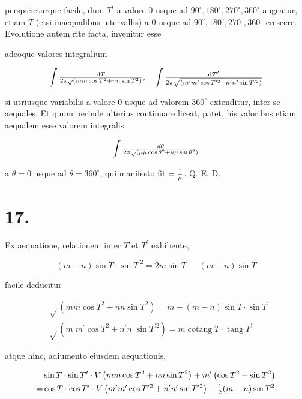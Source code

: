 \documentclass[twoside,12pt, showframe]{memoir}
\let\oldfrac\frac
\def\frac#1#2{\mathchoice{\tfrac{#1}{#2}}{\oldfrac{#1}{#2}}{\genfrac{}{}{}{2}{#1}{#2\mathstrut}}{\genfrac{}{}{}{3}{#1}{#2\mathstrut}}}
\begin{document}
perspicieturque facile, dum \(T^{\prime}\) a valore 0 usque ad \(90^{\circ}, 180^{\circ}, 270^{\circ}, 360^{\circ}\) augeatur, etiam \(T\) (etsi inaequalibus intervallis) a 0 usque ad \(90^{\circ}, 180^{\circ}, 270^{\circ}, 360^{\circ}\) crescere. Evolutione autem rite facta, invenitur esse

adeoque valores integralium

\[
\int \frac{\mathrm{d} T}{2 \pi \sqrt{ }\left(m m \cos T^{2}+n n \sin T^{2}\right)}, \quad \int \frac{\mathrm{d} \boldsymbol{T}^{\prime}}{2 \pi \sqrt{\left(m^{\prime} m^{\prime} \cos T^{\prime 2}+n^{\prime} n^{\prime} \sin T^{\prime 2}\right)}}
\]

si utriusque variabilis a valore 0 usque ad valorem \(360^{\circ}\) extenditur, inter se aequales. Et quum perinde ulterius continuare liceat, patet, his valoribus etiam aequalem esse valorem integralis

\[
\int \frac{d \theta}{2 \pi \sqrt{ }\left(\mu \mu \cos \theta^{2}+\mu \mu \sin \theta^{2}\right)}
\]

a \(\theta=0\) usque ad \(\theta=360^{\circ}\), qui manifesto fit \(=\frac{1}{\mu}\). Q. E. D.

\section*{17.}
Ex aequatione, relationem inter \(T\) et \(T^{\prime}\) exhibente,

\[
(m-n) \sin T \cdot \sin T^{\prime 2}=2 m \sin T^{\prime}-(m+n) \sin T
\]

facile deducitur

\[
\begin{aligned}
& \sqrt{ }\left(m m \cos T^{2}+n n \sin T^{2}\right)=m-(m-n) \sin T \cdot \sin T^{\prime} \\
& \sqrt{ }\left(m^{\prime} m^{\prime} \cos T^{2}+n^{\prime} n^{\prime} \sin T^{\prime 2}\right)=m \operatorname{cotang} T \cdot \operatorname{tang} T^{\prime}
\end{aligned}
\]

atque hinc, adiumento eiusdem aequationis,

\[
\begin{aligned}
& \sin T \cdot \sin T^{\prime} \cdot V\left(m m \cos T^{2}+n n \sin T^{2}\right)+m^{\prime}\left(\cos T^{2}-\sin T^{2}\right) \\
= & \cos T \cdot \cos T^{\prime} \cdot V\left(m^{\prime} m^{\prime} \cos T^{\prime 2}+n^{\prime} n^{\prime} \sin T^{\prime 2}\right)-\frac{1}{2}(m-n) \sin T^{2}
\end{aligned}
\]
\end{document}
